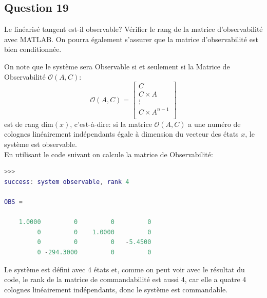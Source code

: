 \documentclass[class=article, crop=false]{standalone}
\begin{document}
\subsection{Question 19}
\begin{exercise}
    Le linéarisé tangent est-il observable? Vérifier le rang de la matrice d'observabilité avec MATLAB. On pourra également s'assurer que la matrice d'observabilité est bien conditionnée.
\end{exercise}
\begin{resolution}
    On note que le système sera Observable si et seulement si la Matrice de Observabilité $\mathcal{O}(A, C)$:
    \begin{equation}
        \boxed{
            \mathcal{O}(A, C) =
            \begin{bmatrix}
                C\\
                C\times A\\
                \vdots\\
                C\times A^{n-1}\\
            \end{bmatrix}
        }
    \end{equation}
    est de rang dim$(x)$, c'est-à-dire: si la matrice $\mathcal{O}(A, C)$ a une numéro de colognes linéairement indépendants égale à dimension du vecteur des états $x$, le système est observable.\\

    En utilisant le code suivant on calcule la matrice de Observabilité:
    \begin{scriptsize}\mycode
        
    \end{scriptsize}
    \begin{scriptsize}\mycode
        \begin{lstlisting}[language=Matlab]
>>>
success: system observable, rank 4

OBS =

    1.0000         0         0         0
         0         0    1.0000         0
         0         0         0   -5.4500
         0 -294.3000         0         0
        \end{lstlisting}
    \end{scriptsize}
    Le système est défini avec 4 états et, comme on peut voir avec le résultat du code, le rank de la matrice de commandabilité est aussi 4, car elle a quatre 4 colognes linéairement indépendants, donc le système est commandable.
\end{resolution}
\end{document}

